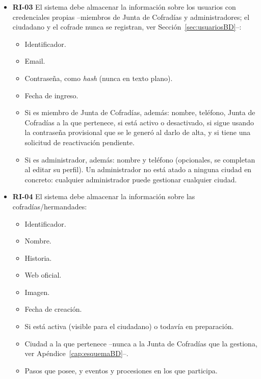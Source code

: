 \begin{itemize}
    \item \textbf{RI-03}  El sistema debe almacenar la información sobre los usuarios con credenciales propias --miembros de Junta de Cofradías y administradores; el ciudadano y el cofrade nunca se registran, ver Sección~\ref{sec:usuariosBD}--:
    \begin{itemize}
        \item Identificador.
        \item Email.
        \item Contraseña, como \emph{hash} (nunca en texto plano).
        \item Fecha de ingreso.
        \item Si es miembro de Junta de Cofradías, además: nombre, teléfono, Junta de Cofradías a la que pertenece, si está activo o desactivado, si sigue usando la contraseña provisional que se le generó al darlo de alta, y si tiene una solicitud de reactivación pendiente.
        \item Si es administrador, además: nombre y teléfono (opcionales, se completan al editar su perfil). Un administrador no está atado a ninguna ciudad en concreto: cualquier administrador puede gestionar cualquier ciudad.
    \end{itemize}

    \item \textbf{RI-04}  El sistema debe almacenar la información sobre las cofradías/hermandades:
    \begin{itemize}
        \item Identificador.
        \item Nombre.
        \item Historia.
        \item Web oficial.
        \item Imagen.
        \item Fecha de creación.
        \item Si está activa (visible para el ciudadano) o todavía en preparación.
        \item Ciudad a la que pertenece --nunca a la Junta de Cofradías que la gestiona, ver Apéndice~\ref{cap:esquemaBD}--.
        \item Pasos que posee, y eventos y procesiones en los que participa.
    \end{itemize}


\end{itemize}
